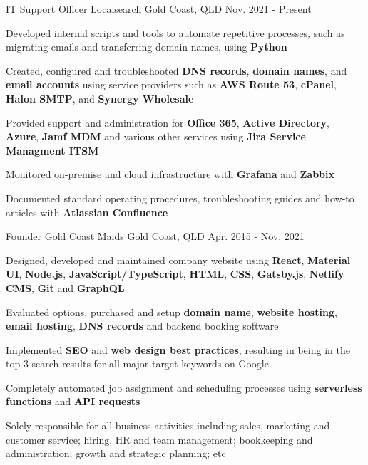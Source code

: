 \begin{cventries}
  \cventry
    {IT Support Officer}
    {Localsearch}
    {Gold Coast, QLD}
    {Nov. 2021 - Present}
    {
      \begin{cvitems}
        \item {Developed internal scripts and tools to automate repetitive processes, such as migrating emails and transferring domain names, using \textbf{Python}}
        \item {Created, configured and troubleshooted \textbf{DNS records}, \textbf{domain names}, and \textbf{email accounts} using service providers such as \textbf{AWS Route 53}, \textbf{cPanel}, \textbf{Halon SMTP}, and \textbf{Synergy Wholesale}}
        \item {Provided support and administration for \textbf{Office 365}, \textbf{Active Directory}, \textbf{Azure}, \textbf{Jamf MDM} and various other services using \textbf{Jira Service Managment ITSM}}
        \item {Monitored on-premise and cloud infrastructure with \textbf{Grafana} and \textbf{Zabbix}}
        \item {Documented standard operating procedures, troubleshooting guides and how-to articles with \textbf{Atlassian Confluence}}
      \end{cvitems}
    }
  \cventry
    {Founder}
    {Gold Coast Maids}
    {Gold Coast, QLD}
    {Apr. 2015 - Nov. 2021}
    {
      \begin{cvitems}
        \item {Designed, developed and maintained company website using \textbf{React}, \textbf{Material UI}, \textbf{Node.js}, \textbf{JavaScript/TypeScript}, \textbf{HTML}, \textbf{CSS}, \textbf{Gatsby.js}, \textbf{Netlify CMS}, \textbf{Git} and \textbf{GraphQL}}
        \item {Evaluated options, purchased and setup \textbf{domain name}, \textbf{website hosting}, \textbf{email hosting}, \textbf{DNS records} and backend booking software}
        \item {Implemented \textbf{SEO} and \textbf{web design best practices}, resulting in being in the top 3 search results for all major target keywords on Google}
        \item {Completely automated job assignment and scheduling processes using \textbf{serverless functions} and \textbf{API requests}}
        \item {Solely responsible for all business activities including sales, marketing and customer service; hiring, HR and team management; bookkeeping and administration; growth and strategic planning; etc}

\end{cvitems}}
\end{cventries}
